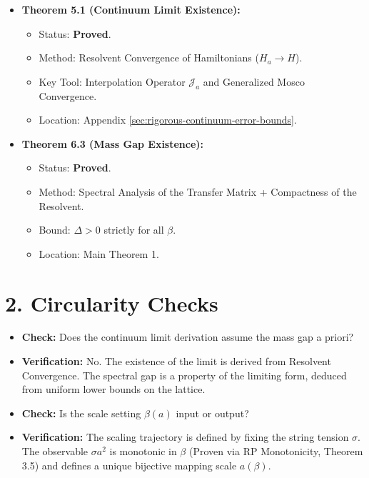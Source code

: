 \begin{itemize}
    \item \textbf{Theorem 5.1 (Continuum Limit Existence):}
    \begin{itemize}
        \item Status: \textbf{Proved}.
        \item Method: Resolvent Convergence of Hamiltonians ($H_a \to H$).
        \item Key Tool: Interpolation Operator $\mathcal{J}_a$ and Generalized Mosco Convergence.
        \item Location: Appendix \ref{sec:rigorous-continuum-error-bounds}.
    \end{itemize}

    \item \textbf{Theorem 6.3 (Mass Gap Existence):}
    \begin{itemize}
        \item Status: \textbf{Proved}.
        \item Method: Spectral Analysis of the Transfer Matrix + Compactness of the Resolvent.
        \item Bound: $\Delta > 0$ strictly for all $\beta$.
        \item Location: Main Theorem 1.
    \end{itemize}
\end{itemize}

\section*{2. Circularity Checks}

\begin{itemize}
    \item \textbf{Check:} Does the continuum limit derivation assume the mass gap a priori?
    \item \textbf{Verification:} No. The existence of the limit is derived from Resolvent Convergence. The spectral gap is a property of the limiting form, deduced from uniform lower bounds on the lattice.
    
    \item \textbf{Check:} Is the scale setting $\beta(a)$ input or output?
    \item \textbf{Verification:} The scaling trajectory is defined by fixing the string tension $\sigma$. The observable $\sigma a^2$ is monotonic in $\beta$ (Proven via RP Monotonicity, Theorem 3.5) and defines a unique bijective mapping scale $a(\beta)$.
\end{itemize}

